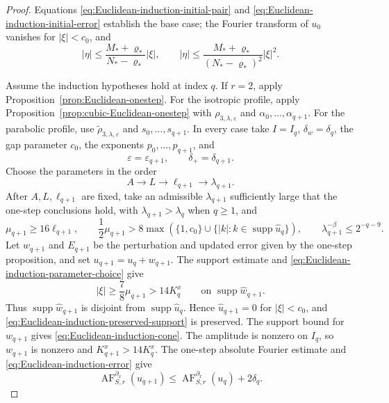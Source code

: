 \documentclass[12pt,reqno,letterpaper]{amsart}
\numberwithin{equation}{section}
\theoremstyle{definition}
\newcommand{\eps}{\varepsilon}
\newcommand{\la}{\lambda}
\newcommand{\supp}{\operatorname{supp}}
\newcommand{\abs}[1]{\left\lvert #1\right\rvert}
\begin{document}
\begin{proof}
Equations \eqref{eq:Euclidean-induction-initial-pair} and
\eqref{eq:Euclidean-induction-initial-error} establish the base case; the
Fourier transform of $u_0$ vanishes for $\abs\xi<c_0$, and
\[
 \abs\eta\leq\frac{M_*+\varrho_*}{N_*-\varrho_*}\abs\xi,
 \qquad
 \abs\eta\leq
 \frac{M_*+\varrho_*}{(N_*-\varrho_*)^2}\abs\xi^2.
\]

Assume the induction hypotheses hold at index $q$.  If $r=2$, apply
Proposition~\ref{prop:Euclidean-onestep}.  For the isotropic profile,
apply Proposition~\ref{prop:cubic-Euclidean-onestep} with
$\rho_{3,\la,\eps}$ and
$\alpha_0,\ldots,\alpha_{q+1}$.  For the parabolic profile, use
$\widetilde{\rho}_{3,\la,\eps}$ and
$s_0,\ldots,s_{q+1}$.  In every case take $I=I_q$,
$\delta_w=\delta_q$, the gap parameter $c_0$, the exponents
$p_0,\ldots,p_{q+1}$, and
\[
 \eps=\eps_{q+1},\qquad \delta_+=\delta_{q+1}.
\]
Choose the parameters in the order
\[
 A\longrightarrow L\longrightarrow
 \ell_{q+1}\longrightarrow\la_{q+1}.
\]
After $A,L,\ell_{q+1}$ are fixed, take an admissible $\la_{q+1}$
sufficiently large that the one-step conclusions hold, with
$\la_{q+1}>\la_q$ when $q\geq1$, and
\begin{equation}\label{eq:Euclidean-induction-parameter-choice}
 \mu_{q+1}\geq16\ell_{q+1},\qquad
 \frac12\mu_{q+1}>
 8\max\left(\{1,c_0\}\cup
 \{\abs k:k\in\supp\widehat u_q\}\right),
 \qquad \la_{q+1}^{-\beta}\leq2^{-q-9}.
\end{equation}
Let $w_{q+1}$ and $E_{q+1}$ be the perturbation and updated error given
by the one-step proposition, and set
$u_{q+1}=u_q+w_{q+1}$.
The support estimate and
\eqref{eq:Euclidean-induction-parameter-choice} give
\[
 \abs\xi\geq\frac78\mu_{q+1}>14K_q^x
 \qquad\text{on }\supp\widehat w_{q+1}.
\]
Thus $\supp\widehat w_{q+1}$ is disjoint from
$\supp\widehat u_q$.  Hence $\widehat u_{q+1}=0$ for $\abs\xi<c_0$, and
\eqref{eq:Euclidean-induction-preserved-support} is preserved.  The
support bound for $w_{q+1}$ gives
\eqref{eq:Euclidean-induction-cone}.  The amplitude is
nonzero on $I_q$, so $w_{q+1}$ is nonzero and
$K_{q+1}^x>14K_q^x$.  The one-step absolute
Fourier estimate and \eqref{eq:Euclidean-induction-error} give
\[
 \operatorname{AF}^{\partial_x}_{S,r}(u_{q+1})
 \leq\operatorname{AF}^{\partial_x}_{S,r}(u_q)+2\delta_q.
\]
\end{proof}
\end{document}

